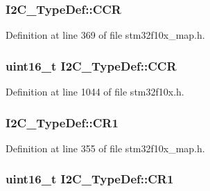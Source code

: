 \subsubsection[{\texorpdfstring{C\+CR}{CCR}}]{ I2\+C\+\_\+\+Type\+Def\+::\+C\+CR}\hypertarget{struct_i2_c___type_def_a1c3ce1b20abc2247a4d48a8856392e40}{}\label{struct_i2_c___type_def_a1c3ce1b20abc2247a4d48a8856392e40}


Definition at line 369 of file stm32f10x\+\_\+map.\+h.

\subsubsection[{\texorpdfstring{C\+CR}{CCR}}]{ {\bf uint16\+\_\+t} I2\+C\+\_\+\+Type\+Def\+::\+C\+CR}\hypertarget{struct_i2_c___type_def_a1775e779008da2b4d1807c2b5033b8a5}{}\label{struct_i2_c___type_def_a1775e779008da2b4d1807c2b5033b8a5}


Definition at line 1044 of file stm32f10x.\+h.

\subsubsection[{\texorpdfstring{C\+R1}{CR1}}]{ I2\+C\+\_\+\+Type\+Def\+::\+C\+R1}\hypertarget{struct_i2_c___type_def_a29d3a752d407b72755f4811abc91bd98}{}\label{struct_i2_c___type_def_a29d3a752d407b72755f4811abc91bd98}


Definition at line 355 of file stm32f10x\+\_\+map.\+h.

\subsubsection[{\texorpdfstring{C\+R1}{CR1}}]{ {\bf uint16\+\_\+t} I2\+C\+\_\+\+Type\+Def\+::\+C\+R1}\hypertarget{struct_i2_c___type_def_ad35ea0b199cefb757de20e9b78168534}{}\label{struct_i2_c___type_def_ad35ea0b199cefb757de20e9b78168534}


